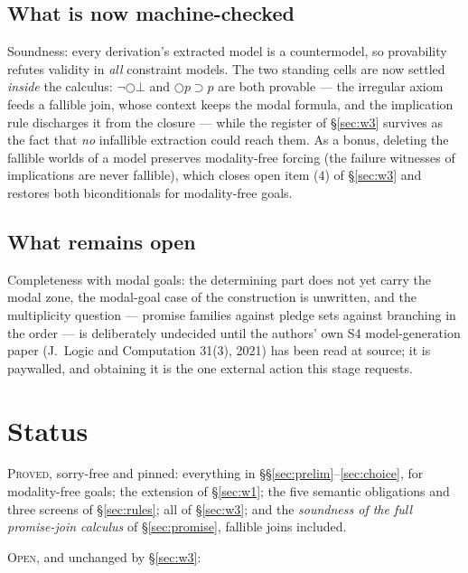 \documentclass[11pt,a4paper]{article}
\begin{document}
\subsection{What is now machine-checked}

Soundness: every derivation's extracted model is a countermodel, so
provability refutes validity in \emph{all} constraint models.  The two
standing cells are now settled \emph{inside} the calculus: $\neg\bigcirc\bot$
and $\bigcirc p \supset p$ are both provable --- the irregular axiom
feeds a fallible join, whose context keeps the modal formula, and the
implication rule discharges it from the closure --- while the register of
\S\ref{sec:w3} survives as the fact that \emph{no} infallible extraction
could reach them.  As a bonus, deleting the fallible worlds of a model
preserves modality-free forcing (the failure witnesses of implications
are never fallible), which closes open item (4) of \S\ref{sec:w3} and
restores both biconditionals for modality-free goals.

\subsection{What remains open}

Completeness with modal goals: the determining part does not yet carry
the modal zone, the modal-goal case of the construction is unwritten, and
the multiplicity question --- promise families against pledge sets
against branching in the order --- is deliberately undecided until the
authors' own S4 model-generation paper (J.\ Logic and Computation 31(3),
2021) has been read at source; it is paywalled, and obtaining it is the
one external action this stage requests.

\section{Status}
\label{sec:status}

\textsc{Proved}, sorry-free and pinned: everything in
\S\S\ref{sec:prelim}--\ref{sec:choice}, for modality-free goals; the
extension of \S\ref{sec:w1}; the five semantic obligations and three
screens of \S\ref{sec:rules}; all of \S\ref{sec:w3}; and the
\emph{soundness of the full promise-join calculus} of
\S\ref{sec:promise}, fallible joins included.

\textsc{Open}, and unchanged by \S\ref{sec:w3}:
\end{document}
